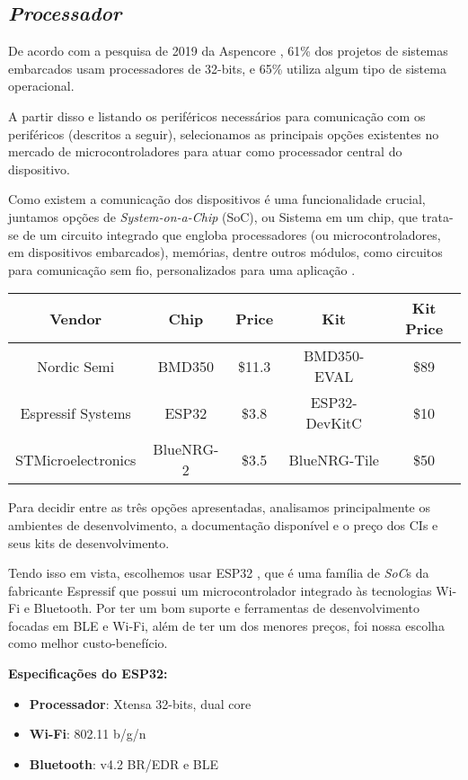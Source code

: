 \documentclass[../monografia.tex]{subfiles}
\begin{document}
\subsection{\textit{Processador}}

De acordo com a pesquisa de 2019 da Aspencore \cite{eetimes}, 61\% dos projetos de sistemas embarcados usam processadores de 32-bits, e 65\% utiliza algum tipo de sistema operacional. 

A partir disso e listando os periféricos necessários para comunicação com os periféricos (descritos a seguir), selecionamos as principais opções existentes no mercado de microcontroladores para atuar como processador central do dispositivo. 

Como existem a comunicação dos dispositivos é uma funcionalidade crucial, juntamos opções de \textit{System-on-a-Chip} (SoC), ou Sistema em um chip, que trata-se de um circuito integrado que engloba processadores (ou microcontroladores, em dispositivos embarcados), memórias, dentre outros módulos, como circuitos para comunicação sem fio, personalizados para uma aplicação \cite{soc}. 

\begin{center}
\begin{tabular}{|c|c|c|c|c|} 
\hline
\textbf{Vendor} & \textbf{Chip} & \textbf{Price} & \textbf{Kit} & \textbf{Kit Price} \\
\hline
Nordic Semi & BMD350 & \$11.3 & BMD350-EVAL & \$89 \\ 
Espressif Systems & ESP32 & \$3.8 & ESP32-DevKitC & \$10 \\ 
STMicroelectronics & BlueNRG-2 & \$3.5 & BlueNRG-Tile & \$50 \\ 
\hline
\end{tabular}
\end{center}

Para decidir entre as três opções apresentadas, analisamos principalmente os ambientes de desenvolvimento, a documentação disponível e o preço dos CIs e seus kits de desenvolvimento. 

Tendo isso em vista, escolhemos usar ESP32 \cite{ESP32}, que é uma família de \textit{SoC}s da fabricante Espressif que possui um microcontrolador integrado às tecnologias Wi-Fi e Bluetooth. Por ter um bom suporte e ferramentas de desenvolvimento focadas em BLE e Wi-Fi, além de ter um dos menores preços, foi nossa escolha como melhor custo-benefício. 

\textbf{Especificações do ESP32:} \cite{ESP-datasheet}
\begin{itemize}
\item \textbf{Processador}: Xtensa 32-bits, dual core
\item \textbf{Wi-Fi}: 802.11 b/g/n
\item \textbf{Bluetooth}: v4.2 BR/EDR e BLE
\end{itemize}
\end{document}
